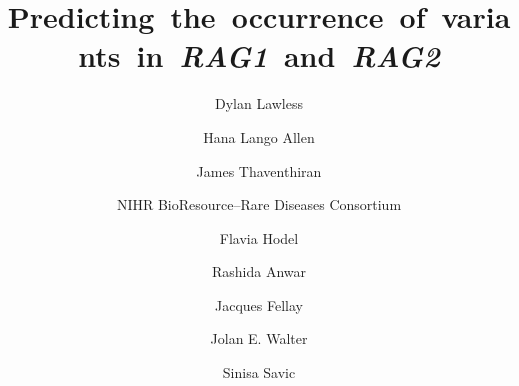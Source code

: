 \documentclass[preprint,11pt,fleqn]{elsarticle}
\begin{document}
\small

\begin{frontmatter}

\title{\mbox{Predicting the occurrence of variants in \textit{RAG1} and \textit{RAG2}}}

\author[add1,add2]{Dylan Lawless}
\author[add3,add4]{Hana Lango Allen}
\author[add5]{James Thaventhiran}
\author[add3]{NIHR BioResource–Rare Diseases Consortium}
\author[add2]{Flavia Hodel}
\author[add1]{Rashida Anwar}
\author[add2,add6]{Jacques Fellay}
\author[add7,add8]{Jolan E. Walter}
\author[add9,add10]{Sinisa Savic}

\address[add1]{Leeds Institute of Biomedical and Clinical Sciences, University of Leeds, Wellcome Trust Brenner Building, St James's University Hospital, Beckett Street, Leeds, UK.}
\address[add2]{Global Health Institute, School of Life Sciences, \'Ecole Polytechnique F\'ed\'erale de Lausanne, 1015, Lausanne, Switzerland.}
\address[add3]{NIHR BioResource, Cambridge University Hospitals, Cambridge Biomedical Campus, Cambridge, CB20QQ, UK.}
\address[add4]{Department of Haematology, University of Cambridge, Cambridge Biomedical Campus, Cambridge, CB20XY, UK.}
\address[add5]{MRC Toxicology Unit, School of Biological Sciences, University of Cambridge, UK.}
\address[add6]{Swiss Institute of Bioinformatics, Lausanne, 1015, Switzerland.}
\address[add7]{University of South Florida and Johns Hopkins All Children's Hospital, Saint Petersburg, Florida, USA.}
\address[add8]{Division of Allergy Immunology, Massachusetts General Hospital for Children, Boston, Massachusetts, USA.}
\address[add9]{Department of Clinical Immunology and Allergy, St James's University Hospital, Beckett Street, Leeds, UK.}
\address[add10]{National Institute for Health Research Leeds Musculoskeletal Biomedical Research Centre and Leeds Institute of Rheumatic and Musculoskeletal Medicine, Wellcome Trust Brenner Building, St James's University Hospital, Beckett Street, Leeds, UK.}




\end{frontmatter}
\end{document}
